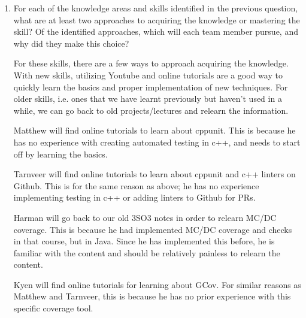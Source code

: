 \begin{enumerate}
\item For each of the knowledge areas and skills identified in the previous
question, what are at least two approaches to acquiring the knowledge or
mastering the skill?  Of the identified approaches, which will each team
member pursue, and why did they make this choice?

For these skills, there are a few ways to approach acquiring the knowledge. With new skills, utilizing Youtube and online tutorials
are a good way to quickly learn the basics and proper implementation of new techniques. For older skills, i.e. ones that we have learnt
previously but haven't used in a while, we can go back to old projects/lectures and relearn the information.

Matthew will find online tutorials to learn about cppunit. This is because he has no experience with creating automated testing in c++, and needs 
to start off by learning the basics.

Tarnveer will find online tutorials to learn about cppunit and c++ linters on Github. This is for the same reason as above; he has no experience
implementing testing in c++ or adding linters to Github for PRs.

Harman will go back to our old 3SO3 notes in order to relearn MC/DC coverage. This is because he had implemented MC/DC coverage and checks 
in that course, but in Java. Since he has implemented this before, he is familiar with the content and should be relatively painless to 
relearn the content.

Kyen will find online tutorials for learning about GCov. For similar reasons as Matthew and Tarnveer, this is because he has no prior experience with 
this specific coverage tool. 

\end{enumerate}
